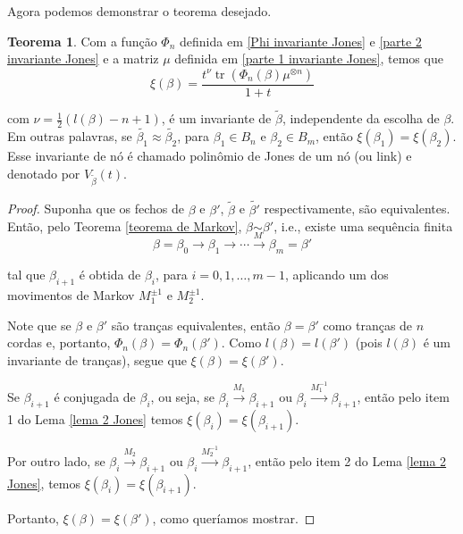 \documentclass[a4paper,portuguese,11pt,twoside, leqno]{book}
\DeclareMathOperator{\tr}{tr}
\theoremstyle{definition}
\newtheorem{theorem}{Teorema}[section]
\begin{document}
	\par\vspace{0.3cm} Agora podemos demonstrar o teorema desejado.
	\begin{theorem}
		\label{polinomio de Jones}
		Com a função $\Phi_n$ definida em \eqref{Phi invariante Jones} e \eqref{parte 2 invariante Jones} e a matriz $\mu$ definida em \eqref{parte 1 invariante Jones}, temos que
		\begin{equation}
		\label{invariante Jones}
		\xi(\beta) = \frac{t^{\nu}\tr(\Phi_n(\beta)\mu^{\otimes n})}{1+t}
		\end{equation}
		\par\vspace{0.3cm} com $\nu = \displaystyle{ \frac{1}{2}(l(\beta) - n + 1) }$, é um invariante de $\widetilde{\beta}$, independente da escolha de $\beta$. Em outras palavras, se $\widetilde{\beta_1}\approx\widetilde{\beta_2}$, para $\beta_1\in B_n$ e $\beta_2\in B_m$, então $\xi(\beta_1) = \xi(\beta_2)$. Esse invariante de nó é chamado polinômio de Jones de um nó (ou link) e denotado por $V_{\widetilde{\beta}}(t)$.
	\end{theorem}
	\begin{proof}
		Suponha que os fechos de $\beta$ e $\beta'$, $\widetilde{\beta}$ e $\widetilde{\beta'}$ respectivamente, são equivalentes. Então, pelo Teorema \eqref{teorema de Markov}, $\beta\underset{M}{\sim}\beta'$, i.e., existe uma sequência finita
		\begin{equation*}
		\beta = \beta_0\to\beta_1\to\cdots\to\beta_m=\beta'
		\end{equation*}
		\par\vspace{0.3cm} tal que $\beta_{i+1}$ é obtida de $\beta_i$, para $i = 0,1,\dots,m-1$, aplicando um dos movimentos de Markov $M_1^{\pm1}$ e $M_2^{\pm1}$.
		\par\vspace{0.3cm} Note que se $\beta$ e $\beta'$ são tranças equivalentes, então $\beta = \beta'$ como tranças de $n$ cordas e, portanto, $\Phi_n(\beta) = \Phi_n(\beta')$. Como $l(\beta) = l(\beta')$ (pois $l(\beta)$ é um invariante de tranças), segue que $\xi(\beta) = \xi(\beta')$.
		\par\vspace{0.3cm} Se $\beta_{i+1}$ é conjugada de $\beta_i$, ou seja, se $\beta_i\xrightarrow{M_1}\beta_{i+1}$ ou $\beta_i\xrightarrow{M_1^{-1}}\beta_{i+1}$, então pelo item 1 do Lema \eqref{lema 2 Jones} temos $\xi(\beta_i) = \xi(\beta_{i+1})$.
		\par\vspace{0.3cm} Por outro lado, se $\beta_i\xrightarrow{M_2}\beta_{i+1}$ ou $\beta_i\xrightarrow{M_2^{-1}}\beta_{i+1}$, então pelo item 2 do Lema \eqref{lema 2 Jones}, temos $\xi(\beta_i) = \xi(\beta_{i+1})$.
		\par\vspace{0.3cm} Portanto, $\xi(\beta) = \xi(\beta')$, como queríamos mostrar.
	\end{proof}
\end{document}
